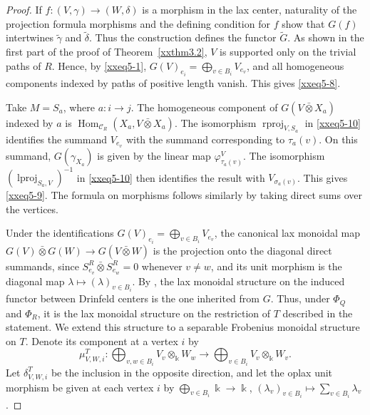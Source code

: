\documentclass{amsart}
\DeclareMathOperator{\lproj}{lproj}
\DeclareMathOperator{\rproj}{rproj}
\newcommand{\btensor}{\mathbin{\bar{\otimes}}}
\theoremstyle{definition}
\theoremstyle{remark}
\numberwithin{equation}{section}
\begin{document}
\begin{proof}
If $f\colon(V,\gamma)\to(W,\delta)$ is a morphism in the lax center,
naturality of the projection formula morphisms and the defining condition for $f$
show that $G(f)$ intertwines $\widetilde\gamma$ and
$\widetilde\delta$.
Thus the construction defines the functor $\widetilde G$.
As shown in the first part of the proof of
Theorem~\ref{xxthm3.2},
$V$ is supported only on the trivial paths of $R$.
Hence, by
\eqref{xxeq5-1},
$G(V)_{e_i}=\bigoplus_{v\in B_i}V_{e_v}$,
and all homogeneous components indexed by paths of positive length vanish.
This gives
\eqref{xxeq5-8}.

Take $M=S_a$, where $a\colon i\to j$.
The homogeneous component of $G(V\btensor X_a)$ indexed by $a$ is
$\operatorname{Hom}_{\mathcal C_R}(X_a,V\btensor X_a)$.
The isomorphism
$\rproj_{V,S_a}$
in \eqref{xxeq5-10} identifies the summand $V_{e_v}$
with the summand corresponding to $\tau_a(v)$.
On this summand,
$G(\gamma_{X_a})$
is given by the linear map
$\varphi^V_{\tau_a(v)}$.
The isomorphism
$(\lproj_{S_a,V})^{-1}$
in \eqref{xxeq5-10} then identifies the
result with $V_{\sigma_a(v)}$.
This gives
\eqref{xxeq5-9}.
The formula on morphisms follows similarly by taking direct sums over the vertices.

Under the identifications
$G(V)_{e_i}=\bigoplus_{v\in B_i}V_{e_v}$, the canonical lax monoidal map
$G(V)\btensor G(W)\to G(V\btensor W)$ is the projection onto the diagonal
direct summands, since
$S_{e_v}^R\btensor S_{e_w}^R=0$ whenever $v\neq w$, and its unit morphism
is the diagonal map $\lambda\mapsto(\lambda)_{v\in B_i}$.
By \cite[Theorem~4.10]{flake2026projection}, the lax
monoidal structure on the induced functor between Drinfeld centers is
the one inherited from $G$.
Thus, under $\Phi_Q$ and $\Phi_R$, it is the lax monoidal structure on the
restriction of $T$ described in the statement.
We extend this structure to a separable Frobenius monoidal structure on
$T$. Denote its component at a vertex $i$ by
\[
\mu^T_{V,W,i}\colon
\bigoplus_{v,w\in B_i}
V_v\otimes_{\Bbbk}W_w
\longrightarrow
\bigoplus_{v\in B_i}
V_v\otimes_{\Bbbk}W_v.
\]
Let $\delta^T_{V,W,i}$ be the inclusion in the opposite direction, and let
the oplax unit morphism be given at each vertex $i$ by
$\bigoplus_{v\in B_i}\Bbbk\to \Bbbk$,
$(\lambda_v)_{v\in B_i}\mapsto\sum_{v\in B_i}\lambda_v$.


\end{proof}
\end{document}
